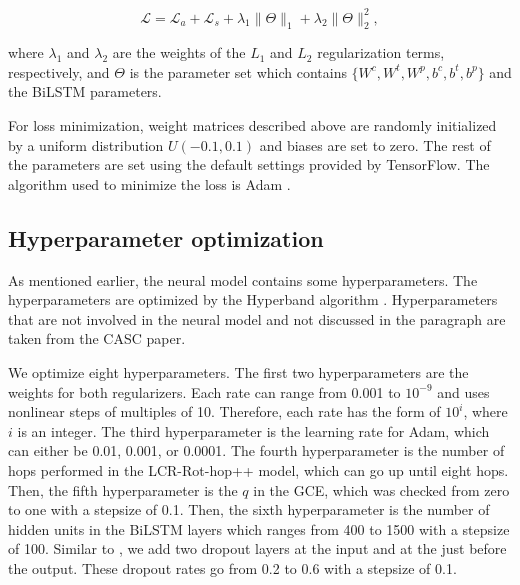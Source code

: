 \documentclass[american, oneside]{ecsgdp}
\begin{document}
\begin{equation}
    \mathcal{L} = \mathcal{L}_a + \mathcal{L}_s + \lambda_1 \|\Theta\|_1 + \lambda_2  \|\Theta\|^2_2,
\end{equation}

\noindent where $\lambda_1$ and $\lambda_2$ are the weights of the $L_1$ and $L_2$ regularization terms, respectively, and $\Theta$ is the parameter set which contains $\{W^c, W^t, W^p, b^c, b^t, b^p\}$ and the BiLSTM parameters.

For loss minimization, weight matrices described above are randomly initialized by a uniform distribution $U(-0.1, 0.1)$ and biases are set to zero. The rest of the parameters are set using the default settings provided by TensorFlow. The algorithm used to minimize the loss is Adam \parencite{Kingma2017Adam}. %

\subsection{Hyperparameter optimization} \label{sec:hypertune}
As mentioned earlier, the neural model contains some hyperparameters. The hyperparameters are optimized by the Hyperband algorithm \parencite{Li2018Hyperband}. %
Hyperparameters that are not involved in the neural model and not discussed in the paragraph are taken from the CASC \parencite{Kumar2021CASC} paper.

We optimize eight hyperparameters. The first two hyperparameters are the weights for both regularizers. Each rate can range from 0.001 to $10^{-9}$ and uses nonlinear steps of multiples of 10. Therefore, each rate has the form of $10^{i}$, where $i$ is an integer. The third hyperparameter is the learning rate for Adam, which can either be 0.01, 0.001, or 0.0001. The fourth hyperparameter is the number of hops performed in the LCR-Rot-hop++ model, which can go up until eight hops. Then, the fifth hyperparameter is the $q$ in the GCE, which was checked from zero to one with a stepsize of 0.1. Then, the sixth hyperparameter is the number of hidden units in the BiLSTM layers which ranges from  400 to 1500 with a stepsize of 100. Similar to \textcite{Trusca2020HAABSA++}, we add two dropout layers at the input and at the just before the output. These dropout rates go from 0.2 to 0.6 with a stepsize of 0.1.


\end{document}
